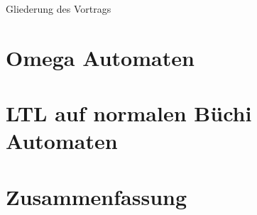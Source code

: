 \documentclass[14pt]{beamer}
\date{25. Februar 2016}
\def\tocname{Gliederung des Vortrags}
\begin{document}
\fontsize{14pt}{14pt}
	
{
\begin{frame}%
	\titlepage
\end{frame}}

\begin{frame}{\tocname}
	\tableofcontents
\end{frame}


\section{Omega Automaten}



\section{LTL auf normalen Büchi Automaten}
 

\section{Zusammenfassung}


\section{\bibname}
\begin{frame}[allowframebreaks]{\bibname}
	\AtBeginSection{}
	\nocite{*}
	
	
\end{frame}
\end{document}

